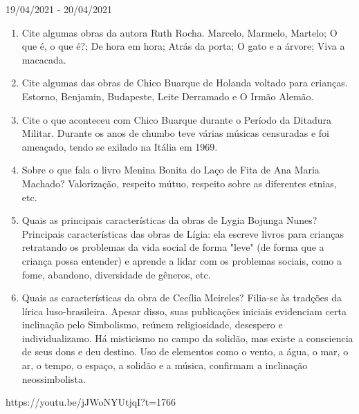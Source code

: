 \documentclass{SchoolBook}
\begin{document}
\begin{day}{19/04/2021 - 20/04/2021}
\begin{enumerate}
            \item Cite algumas obras da autora Ruth Rocha.
            \response Marcelo, Marmelo, Martelo; O que é, o que é?; De hora em hora; Atrás da porta; O gato e a árvore; Viva a macacada.

            \item Cite algumas das obras de Chico Buarque de Holanda voltado para crianças.
            \response Estorno, Benjamin, Budapeste, Leite Derramado e O Irmão Alemão.

            \item Cite o que aconteceu com Chico Buarque durante o Período da Ditadura Militar.
            \response Durante os anos de chumbo teve várias músicas censuradas e foi ameaçado, tendo se exilado na Itália em 1969.

            \item Sobre o que fala o livro Menina Bonita do Laço de Fita de Ana Maria Machado?
            \response Valorização, respeito mútuo, respeito sobre as diferentes etnias, etc.

            \item Quais as principais características da obras de Lygia Bojunga Nunes?
            \response Principais características das obras de Lígia: ela escreve livros para crianças retratando os problemas da vida social de forma "leve" (de forma que a criança possa entender) e aprende a lidar com os problemas sociais, como a fome, abandono, diversidade de gêneros, etc.

            \item Quais as características da obra de Cecília Meireles?
            \response Filia-se às tradções da lírica luso-brasileira. Apesar disso, suas publicações iniciais evidenciam certa inclinação pelo Simbolismo, reúnem religiosidade, desespero e individualizamo. Há misticismo no campo da solidão, mas existe a consciencia de seus dons e deu destino. Uso de elementos como o vento, a água, o mar, o ar, o tempo, o espaço, a solidão e a música, confirmam a inclinação neossimbolista.
        \end{enumerate}
    \end{day}
  
    https://youtu.be/jJWoNYUtjqI?t=1766
\end{document}
